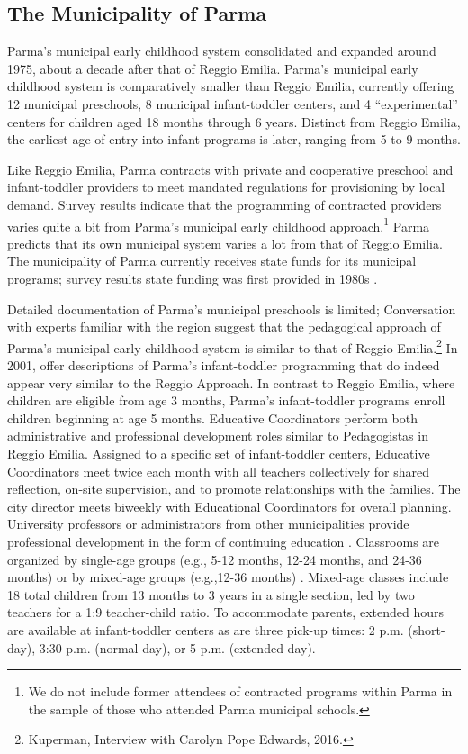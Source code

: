 \subsection{The Municipality of Parma}

Parma's municipal early childhood system consolidated and expanded around 1975, about a decade after that of Reggio Emilia. Parma's municipal early childhood system is comparatively smaller than Reggio Emilia, currently offering 12 municipal preschools, 8 municipal infant-toddler centers, and 4 ``experimental'' centers for children aged 18 months through 6 years. Distinct from Reggio Emilia, the earliest age of entry into infant programs is later, ranging from 5 to 9 months. 

Like Reggio Emilia, Parma contracts with private and cooperative preschool and infant-toddler providers to meet mandated regulations for provisioning by local demand. Survey results indicate that the programming of contracted providers varies quite a bit from Parma's municipal early childhood approach.\footnote{We do not include former attendees of contracted programs within Parma in the sample of those who attended Parma municipal schools.} Parma predicts that its own municipal system varies a lot from that of Reggio Emilia. The municipality of Parma currently receives state funds for its municipal programs; survey results state funding was first provided in 1980s \citep{CEHD_2016_Historical-Analysis}.

Detailed documentation of Parma's municipal preschools is limited; Conversation with experts familiar with the region suggest that the pedagogical approach of Parma's municipal early childhood system is similar to that of Reggio Emilia.\footnote{Kuperman, Interview with Carolyn Pope Edwards, 2016.} In 2001,\citet{Terzi-Cantarelli_2001_Parma} offer descriptions of Parma's infant-toddler programming that do indeed appear very similar to the Reggio Approach. In contrast to Reggio Emilia, where children are eligible from age 3 months, Parma's infant-toddler programs enroll children beginning at age 5 months. Educative Coordinators perform both administrative and professional development roles similar to Pedagogistas in Reggio Emilia. Assigned to a specific set of infant-toddler centers, Educative Coordinators meet twice each month with all teachers collectively for shared reflection, on-site supervision, and to promote relationships with the families. The city director meets biweekly with Educational Coordinators for overall planning. University professors or administrators from other municipalities provide professional development in the form of continuing education \citep{Terzi-Cantarelli_2001_Parma}. Classrooms are organized by single-age groups (e.g., 5-12 months, 12-24 months, and 24-36 months) or by mixed-age groups (e.g.,12-36 months) \citep{Majorano-etal_2009_CC-in-P}. Mixed-age classes include 18 total children from 13 months to 3 years in a single section, led by two teachers for a 1:9 teacher-child ratio. To accommodate parents, extended hours are available at infant-toddler centers as are three pick-up times: 2 p.m. (short-day), 3:30 p.m. (normal-day), or 5 p.m. (extended-day).


